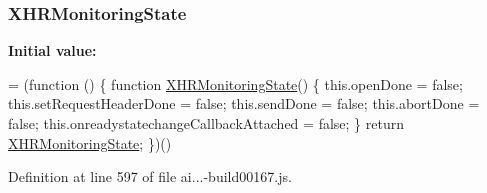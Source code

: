 \subsubsection[{\texorpdfstring{X\+H\+R\+Monitoring\+State}{XHRMonitoringState}}]{ X\+H\+R\+Monitoring\+State}\hypertarget{obj_2_release_2_package_2_package_tmp_2_scripts_2ai_80_822_89-build00167_8js_a4f771bfa65091853b832d27ff5e9c716}{}\label{obj_2_release_2_package_2_package_tmp_2_scripts_2ai_80_822_89-build00167_8js_a4f771bfa65091853b832d27ff5e9c716}
{\bfseries Initial value\+:}
\begin{DoxyCode}
= (\textcolor{keyword}{function} () \{
            \textcolor{keyword}{function} \hyperlink{obj_2_release_2_package_2_package_tmp_2_scripts_2ai_80_822_89-build00167_8js_a4f771bfa65091853b832d27ff5e9c716}{XHRMonitoringState}() \{
                this.openDone = \textcolor{keyword}{false};
                this.setRequestHeaderDone = \textcolor{keyword}{false};
                this.sendDone = \textcolor{keyword}{false};
                this.abortDone = \textcolor{keyword}{false};
                this.onreadystatechangeCallbackAttached = \textcolor{keyword}{false};
            \}
            \textcolor{keywordflow}{return} \hyperlink{obj_2_release_2_package_2_package_tmp_2_scripts_2ai_80_822_89-build00167_8js_a4f771bfa65091853b832d27ff5e9c716}{XHRMonitoringState};
        \})()
\end{DoxyCode}


Definition at line 597 of file ai...-\/build00167.\+js.

